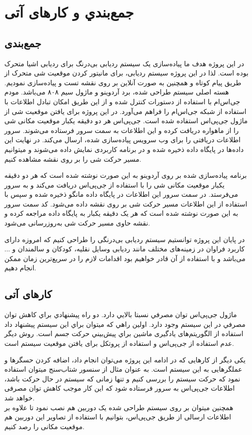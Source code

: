 \chapter{جمع‌بندي و کارهای آتی}
\section{جمع‌بندی}
در این پروژه هدف ما پیاده‌سازی یک سیستم ردیابی بی‌درنگ برای ردیابی اشیا متحرک بوده است.  لذا در این پروژه سیستم ردیابی، برای مانیتور کردن موقعیت شی متحرک از طریق پیام کوتاه و همچنین به صورت آنلاین بر روی نقشه تست و پیاده‌سازی نمودیم. هسته اصلی سیستم طراحی شده، برد آردوینو و ماژول سیم ۸۰۸ می‌باشد. مودم جی‌اس‌ام با استفاده از دستورات  کنترل شده و از این طریق امکان تبادل اطلاعات با استفاده از شبکه جی‌اس‌ام را فراهم می‌آورد. در این پروژه برای یافتن موقعیت شی از ماژول جی‌پی‌اس استفاده شده است. جی‌پی‌اس هر دو دقیقه یکبار موقعیت مکانی شی را از ماهواره دریافت کرده و این اطلاعات به سمت سرور فرستاده می‌شوند. سرور اطلاعات دریافتی را برای وب سرویس پیاده‌سازی شده، ارسال می‌کند. در نهایت این داده‌ها در پایگاه داده ذخیره شده و در برنامه کاربردی نمایش داده می‌شوند و میتوانیم مسیر حرکت شی را بر روی نقشه مشاهده کنیم.


برنامه پیاده‌سازی شده بر روی آردوینو به این صورت نوشته شده است که هر دو دقیقه یکبار موقعیت مکانی شی را با استفاده از جی‌پی‌اس دریافت می‌کند و به سرور می‌فرستد. در سمت سرور  این اطلاعات در پایگاه داده مانگو ذخیره شده و سپس با استفاده از این اطلاعات مسیر حرکت شی بر روی نقشه داده می‌شود. کد سمت سرور به این صورت نوشته شده است که هر یک دقیقه یکبار به پایگاه داده مراجعه کرده و نقشه حاوی مسیر حرکت شی به‌روزرسانی می‌شود.


در پایان این پروژه توانستیم سیستم ردیابی بی‌درنگی را  طراحی کنیم که امروزه دارای کاربرد فراوان در زمینه‌های مختلف مانند ردیابی وسایل نقلیه، کودکان و سالمندان و ... می‌باشد و با استفاده از آن قادر خواهیم بود اقدامات لازم را در سریع‌ترین زمان ممکن انجام دهیم.
\section{کارهای آتی}
ماژول جی‌پی‌اس توان مصرفي نسبتا بالايي دارد. دو راه پيشنهادي براي كاهش توان مصرفي در اين سيستم وجود دارد. اولين راهي كه ميتوان براي اين سيستم پيشنهاد داد استفاده از الگوريتم‌های يادگیری ماشین براي پيش‌بيني حركت جسم است. روش ديگر عدم استفاده از جی‌پی‌اس و استفاده از پروتكل  برای یافتن موقعیت سیستم است.


یکی دیگر از کارهایی که در ادامه این پروژه می‌توان انجام داد، اضافه کردن حسگرها و عملگرهایی به این سیستم است. به عنوان مثال از سنسور شتاب‌سنج میتوان استفاده نمود که حرکت سیستم را بررسی کنیم و تنها زمانی که سیستم در حال حرکت باشد، اطلاعات جی‌پی‌اس به سرور فرستاده شود که این کار موجب کاهش توان مصرفی خواهد شد.\\
همچنین میتوان بر روی سیستم طراحی شده یک دوربین هم نصب نمود تا علاوه بر اطلاعات ارسالی از طریق جی‌پی‌اس، بتوانیم با استفاده از تصاویر این دوربین هم موقعیت مکانی  را رصد کنیم.


